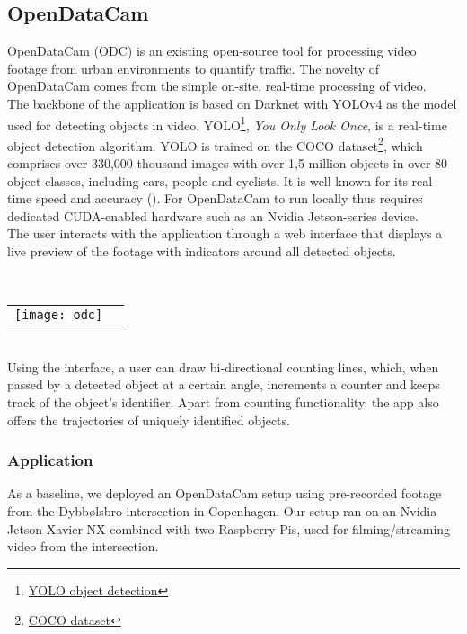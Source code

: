 \subsection{OpenDataCam}
OpenDataCam (ODC) is an existing open-source tool for processing video footage from urban environments to quantify
traffic. The novelty of OpenDataCam comes from the simple on-site, real-time processing of video. 
\ \\

The backbone of the application is based on Darknet with YOLOv4 as the model used for detecting objects in video.
YOLO\footnote{\href{https://pjreddie.com/darknet/yolo/}{YOLO object detection}}, \textit{You Only Look Once}, is a real-time object detection algorithm. 
YOLO is trained on the COCO dataset\footnote{\href{https://cocodataset.org}{COCO dataset}}, which comprises over 330,000 thousand images
with over 1,5 million objects in over 80 object classes, including cars, people and cyclists. 
It is well known for its real-time speed and accuracy (\cite{redmon2016look}). 
For OpenDataCam to run locally thus requires dedicated CUDA-enabled hardware such as an Nvidia Jetson-series device. 
\ \\

The user interacts with the application through a web interface that displays a live preview of the footage with
indicators around all detected objects.

\ \\
\raggedbottom
\noindent
\begin{tabular}{@{}cc}
\texttt{[image: odc]} 
\end{tabular}
\ \\

Using the interface, a user can draw bi-directional counting lines, which, when passed by a detected object at a certain angle, 
increments a counter and keeps track of the object's identifier. Apart from counting functionality, the app also offers the trajectories of uniquely identified objects. 

\raggedbottom
\subsubsection{Application}
As a baseline, we deployed an OpenDataCam setup using pre-recorded footage from the Dybbølsbro intersection in Copenhagen.
Our setup ran on an Nvidia Jetson Xavier NX combined with two Raspberry Pis, used for filming/streaming video from the intersection.

